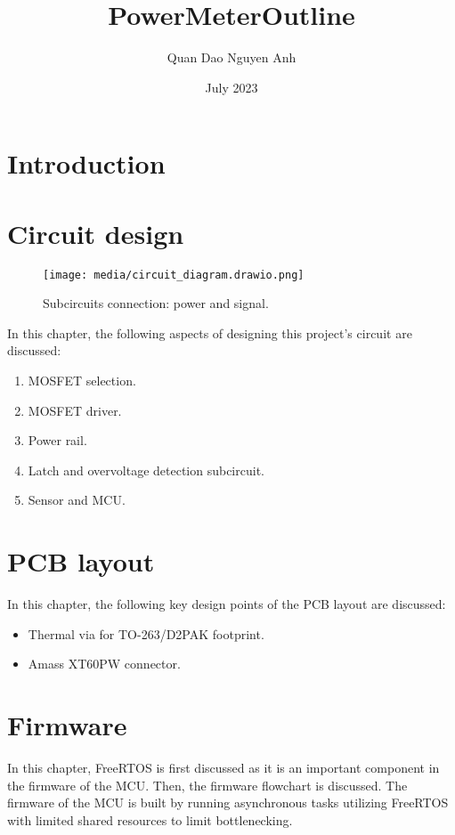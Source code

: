 \documentclass[12pt,letterpaper]{report}
\title{PowerMeterOutline}
\author{Quan Dao Nguyen Anh}
\date{July 2023}
\begin{document}


\pagebreak

\tableofcontents
\listoffigures
\listoftables
\pagebreak
{}

\chapter{Introduction}


\chapter{Circuit design}

\begin{figure}[!h]
  \centerline{\texttt{[image: media/circuit\_diagram.drawio.png]}}
  \caption{Subcircuits connection: power and signal.}
  \label{fig:Circuit flowchart}
\end{figure}

\justify
In this chapter, the following aspects of designing this project's circuit are discussed:
\begin{enumerate}
  \item MOSFET selection.
  \item MOSFET driver.
  \item Power rail.
  \item Latch and overvoltage detection subcircuit.
  \item Sensor and MCU.
\end{enumerate}

\pagebreak

\pagebreak

\pagebreak

\pagebreak

\pagebreak


\chapter{PCB layout}
\justify
In this chapter, the following key design points of the PCB layout are discussed:
\begin{itemize}
  \item Thermal via for TO-263/D2PAK footprint.
  \item Amass XT60PW connector.
\end{itemize}
\pagebreak


\chapter{Firmware}
\justify
In this chapter, FreeRTOS is first discussed as it is an important component in the firmware of the MCU. Then, the firmware flowchart is discussed. The firmware of the MCU is built by running asynchronous tasks utilizing FreeRTOS with limited shared resources to limit bottlenecking.
\pagebreak

\end{document}
